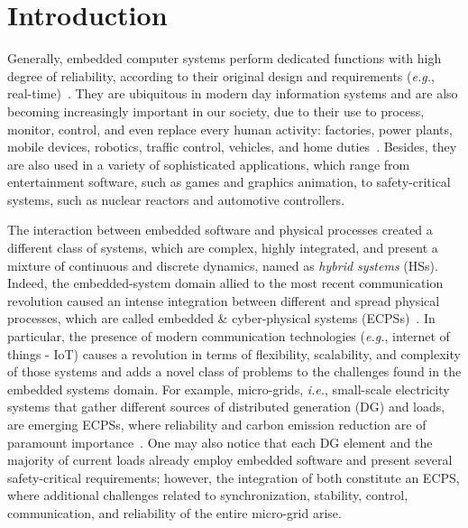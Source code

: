 \documentclass{cta-author}
\begin{document}
\maketitle

\section{Introduction}

Generally, embedded computer systems perform dedicated functions with high degree of reliability, according to their original design and requirements ({\it e.g.}, real-time)~\cite{Kopetz11}. They are ubiquitous in modern day information systems and are also becoming increasingly important in our society, due to their use to process, monitor, control, and even replace every human activity: factories, power plants, mobile devices, robotics, traffic control, vehicles, and home duties~\cite{xu15}. Besides, they are also used in a variety of sophisticated applications, which range from entertainment software, such as games and graphics animation, to safety-critical systems, such as nuclear reactors and automotive controllers. 

The interaction between embedded software and physical processes created a different class of systems, which are complex, highly integrated, and present a mixture of continuous and discrete dynamics, named as \textit{hybrid systems} (HSs). Indeed, the embedded-system domain allied to the most recent communication revolution caused an intense integration between different and spread physical processes, which are called embedded \& cyber-physical systems (ECPSs)~\cite{leeCPS}. In particular, the presence of modern communication technologies ({\it e.g.}, internet of things - IoT) causes a revolution in terms of flexibility, scalability, and complexity of those systems and adds a novel class of problems to the challenges found in the embedded systems domain. For example, micro-grids, {\it i.e.}, small-scale electricity systems that gather different sources of distributed generation (DG) and loads, are emerging ECPSs, where reliability and carbon emission reduction are of paramount importance~\cite{xu15}. One may also notice that each DG element and the majority of current loads already employ embedded software and present several safety-critical requirements; however, the integration of both constitute an ECPS, where additional challenges related to synchronization, stability, control, communication, and reliability of the entire micro-grid arise.
\end{document}

